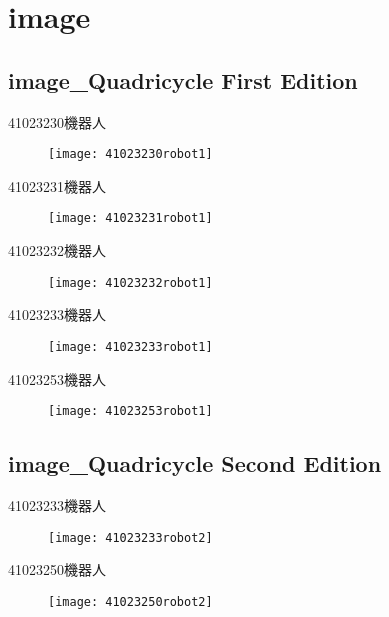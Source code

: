 ﻿\chapter{image}



\section{image\_Quadricycle First Edition}
{41023230機器人\\
\begin{figure}
\texttt{[image: 41023230robot1]}
\end{figure}}
{41023231機器人\\
\begin{figure}
\texttt{[image: 41023231robot1]}
\end{figure}}
{41023232機器人\\
\begin{figure}
\texttt{[image: 41023232robot1]}
\end{figure}}
{41023233機器人\\
\begin{figure}
\texttt{[image: 41023233robot1]}
\end{figure}}
{41023253機器人\\
\begin{figure}
\texttt{[image: 41023253robot1]}
\end{figure}}
\section{image\_Quadricycle Second Edition}
{41023233機器人\\
\begin{figure}
\texttt{[image: 41023233robot2]}
\end{figure}}
{41023250機器人\\
\begin{figure}
\texttt{[image: 41023250robot2]}
\end{figure}}
